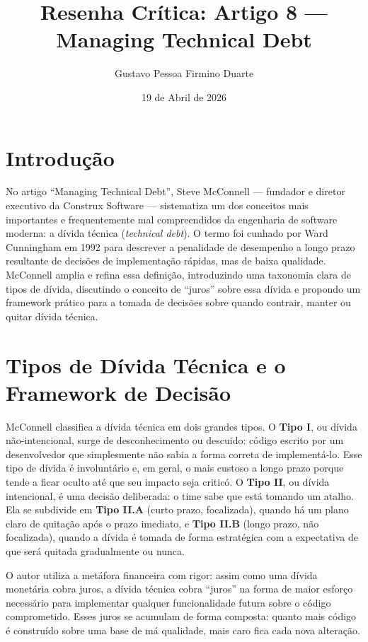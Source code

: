 \documentclass[12pt,a4paper]{article}
\title{Resenha Cr\'itica: Artigo 8 ---\\
Managing Technical Debt}
\author{Gustavo Pessoa Firmino Duarte}
\date{19 de Abril de 2026}
\begin{document}
\maketitle

\section{Introdu\c{c}\~ao}

No artigo ``Managing Technical Debt'', Steve McConnell --- fundador e diretor
executivo da Construx Software --- sistematiza um dos conceitos mais importantes
e frequentemente mal compreendidos da engenharia de software moderna: a d\'ivida
t\'ecnica (\textit{technical debt}). O termo foi cunhado por Ward Cunningham em
1992 para descrever a penalidade de desempenho a longo prazo resultante de
decis\~oes de implementa\c{c}\~ao r\'apidas, mas de baixa qualidade. McConnell
amplia e refina essa defini\c{c}\~ao, introduzindo uma taxonomia clara de tipos
de d\'ivida, discutindo o conceito de ``juros'' sobre essa d\'ivida e propondo
um framework pr\'atico para a tomada de decis\~oes sobre quando contrair, manter
ou quitar d\'ivida t\'ecnica.

\section{Tipos de D\'ivida T\'ecnica e o Framework de Decis\~ao}

McConnell classifica a d\'ivida t\'ecnica em dois grandes tipos. O \textbf{Tipo I},
ou d\'ivida n\~ao-intencional, surge de desconhecimento ou descuido: c\'odigo
escrito por um desenvolvedor que simplesmente n\~ao sabia a forma correta de
implement\'a-lo. Esse tipo de d\'ivida \'e involunt\'ario e, em geral, o mais
custoso a longo prazo porque tende a ficar oculto at\'e que seu impacto seja
critic\'o. O \textbf{Tipo II}, ou d\'ivida intencional, \'e uma decis\~ao
deliberada: o time sabe que est\'a tomando um atalho. Ela se subdivide em
\textbf{Tipo II.A} (curto prazo, focalizada), quando h\'a um plano claro de
quitação ap\'os o prazo imediato, e \textbf{Tipo II.B} (longo prazo, n\~ao
focalizada), quando a d\'ivida \'e tomada de forma estrat\'egica com a expectativa
de que ser\'a quitada gradualmente ou nunca.

O autor utiliza a metáfora financeira com rigor: assim como uma d\'ivida monet\'aria
cobra juros, a d\'ivida t\'ecnica cobra ``juros'' na forma de maior esfor\c{c}o
necess\'ario para implementar qualquer funcionalidade futura sobre o c\'odigo
comprometido. Esses juros se acumulam de forma composta: quanto mais c\'odigo \'e
constru\'ido sobre uma base de m\'a qualidade, mais caro fica cada nova altera\c{c}\~ao.
\end{document}
